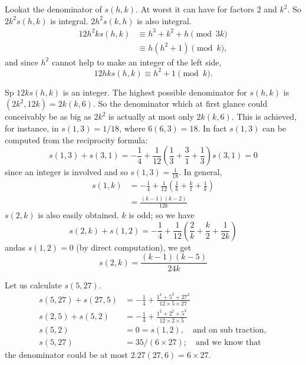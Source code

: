 Look\pageoriginale at the denominator of $s(h, k)$. At worst it can
have for factors 2 and $k^2$. So $2k^2 s(h, k)$ is integral. $2 h^2
s(k, h)$ is also integral.
\begin{align*}
  12 h^2 k s(h, k) & \equiv h^3 + k^2 + h \pmod{3k}\\
  & \equiv h(h^2 + 1) \pmod{k},
\end{align*}
and since $h^2$ cannot help to make an integer of the left side,
$$
12 hk s(h, k)\equiv h^2 + 1 \pmod{k}.
$$

Sp $12k s(h, k)$ is an integer. The highest possible denominator for
$s(h, k)$ is $(2k^2, 12k)= 2k(k, 6)$. So the denominator which at
first glance could conceivably be as big as $2k^2$ is actually at most
only $2k (k, 6)$. This is achieved, for instance, in $s(1,3)=1/18$,
where $6(6,3)=18$. In fact $s(1,3)$ can be computed from the
reciprocity formula:
$$
s(1, 3)+ s(3, 1)=- \frac{1}{4} + \frac{1}{12} \left( \frac{1}{3} +
\frac{3}{1} + \frac{1}{3}\right) s(3, 1)=0
$$
since an integer is involved and so $s(1,3)= \frac{1}{18}$. In
general,
\begin{align*}
  s(1, k)& = - \frac{1}{4} + \frac{1}{12} \left( \frac{1}{k} +
  \frac{k}{1} + \frac{1}{k}\right)\\
  & = \frac{(k-1)(k-2)}{12k}
\end{align*}
$s(2, k)$ is also easily obtained. $k$ is odd; so we have
$$
s(2, k)+ s(1, 2)= - \frac{1}{4} + \frac{1}{12} \left(\frac{2}{k} +
\frac{k}{2} + \frac{1}{2k} \right)
$$
and\pageoriginale as $s(1, 2)=0$ (by direct computation), we get 
$$
s(2, k)= \frac{(k-1)(k-5)}{2 4k}
$$

Let us calculate $s(5, 27)$.
\begin{align*}
  s(5, 27)+ s(27, 5)& = - \frac{1}{4} + \frac{1^2 + 5^2 + 27^2}{12
    \times 5 \times 27}\\
  s(2, 5)+ s(5, 2) & = - \frac{1}{4} + \frac{1^2 + 2^2 + 5^2}{12
    \times 2 \times 5}\\
  s(5, 2) & = 0 = s(1, 2), \quad \text{and on sub traction},\\
  s(5, 27) & = 35/(6 \times 27); \quad \text{and we know that}
\end{align*}
the denominator could be at most $2.27(27,6)= 6 \times 27$.
